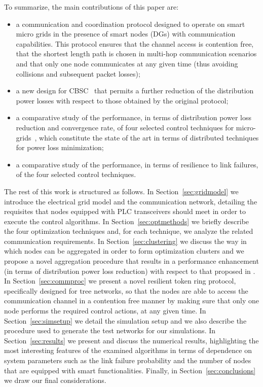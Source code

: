 \documentclass[journal]{IEEEtran}
\newcommand{\secref}[1]{Section~\ref{#1}}
\begin{document}
To summarize, the main contributions of this paper are:
\begin{itemize}
\item a communication and coordination protocol designed to operate on smart micro grids in the presence of smart nodes (DGs) with communication capabilities. This protocol ensures that the channel access is contention free, that the shortest length path is chosen in multi-hop communication scenarios and that only one node communicates at any given time (thus avoiding collisions and subsequent packet losses);
\item a new design for CBSC~\cite{SurroundControl} that permits a further reduction of the distribution power losses with respect to those obtained by the original protocol;
\item a comparative study of the performance, in terms of distribution power loss reduction and convergence rate, of four selected control techniques for micro-grids~\cite{LC,SurroundControl,DORPF}, which constitute the state of the art in terms of distributed techniques for power loss minimization;
\item a comparative study of the performance, in terms of resilience to link failures, of the four selected control techniques.
\end{itemize}

The rest of this work is structured as follows. In \secref{sec:gridmodel} we introduce the electrical grid model and
the communication network, detailing the requisites that nodes equipped with PLC transceivers should meet in order to execute the control algorithms. In \secref{sec:optmethods} we briefly describe the four optimization techniques and, for each technique, we analyze the related communication requirements. In \secref{sec:clustering} we discuss the way in which nodes can be aggregated in order to form optimization clusters and we propose a novel aggregation procedure that results in a performance enhancement (in terms of distribution power loss reduction) with respect to that proposed in \cite{SurroundControl}. In \secref{sec:commproc} we present a novel resilient token ring protocol, specifically designed for tree networks, so that the nodes are able to access the communication channel in a contention free manner by making sure that only one node performs the required control actions, at any given time. In \secref{sec:simsetup} we detail the simulation setup and we also describe the procedure used to generate the test networks for our simulations.
In \secref{sec:results} we present and discuss the numerical results, highlighting the most interesting features of the examined algorithms in terms of dependence on system parameters such as the link failure probability and the number of nodes that are equipped with smart functionalities. 
Finally, in \secref{sec:conclusions} we draw our final considerations.
\end{document}
